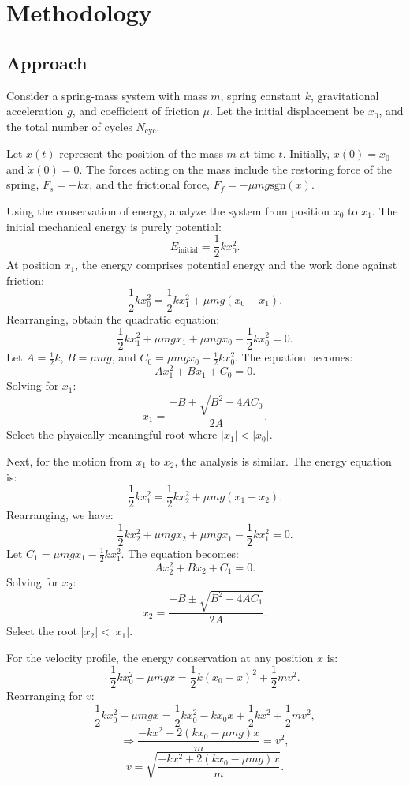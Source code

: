 \documentclass[12pt, a4paper, oneside]{report}
\begin{document}
\chapter{Methodology}
\section{Approach}
Consider a spring-mass system with mass \( m \), spring constant \( k \), gravitational acceleration \( g \), and coefficient of friction \( \mu \). Let the initial displacement be \( x_0 \), and the total number of cycles \( N_{\text{cyc}} \).

Let \( x(t) \) represent the position of the mass \( m \) at time \( t \). Initially, \( x(0) = x_0 \) and \( \dot{x}(0) = 0 \). The forces acting on the mass include the restoring force of the spring, \( F_s = -kx \), and the frictional force, \( F_f = -\mu mg \text{sgn}(\dot{x}) \).

Using the conservation of energy, analyze the system from position \( x_0 \) to \( x_1 \). The initial mechanical energy is purely potential:
\[
	E_{\text{initial}} = \frac{1}{2} k x_0^2.
\]
At position \( x_1 \), the energy comprises potential energy and the work done against friction:
\[
	\frac{1}{2} k x_0^2 = \frac{1}{2} k x_1^2 + \mu mg (x_0 + x_1).
\]
Rearranging, obtain the quadratic equation:
\[
	\frac{1}{2} k x_1^2 + \mu mg x_1 + \mu mg x_0 - \frac{1}{2} k x_0^2 = 0.
\]
Let \( A = \frac{1}{2} k \), \( B = \mu mg \), and \( C_0 = \mu mg x_0 - \frac{1}{2} k x_0^2 \). The equation becomes:
\[
	A x_1^2 + B x_1 + C_0 = 0.
\]
Solving for \( x_1 \):
\[
	x_1 = \frac{-B \pm \sqrt{B^2 - 4AC_0}}{2A}.
\]
Select the physically meaningful root where \( |x_1| < |x_0| \).

Next, for the motion from \( x_1 \) to \( x_2 \), the analysis is similar. The energy equation is:
\[
	\frac{1}{2} k x_1^2 = \frac{1}{2} k x_2^2 + \mu mg (x_1 + x_2).
\]
Rearranging, we have:
\[
	\frac{1}{2} k x_2^2 + \mu mg x_2 + \mu mg x_1 - \frac{1}{2} k x_1^2 = 0.
\]
Let \( C_1 = \mu mg x_1 - \frac{1}{2} k x_1^2 \). The equation becomes:
\[
	A x_2^2 + B x_2 + C_1 = 0.
\]
Solving for \( x_2 \):
\[
	x_2 = \frac{-B \pm \sqrt{B^2 - 4AC_1}}{2A}.
\]
Select the root \( |x_2| < |x_1| \).

For the velocity profile, the energy conservation at any position \( x \) is:
\[
	\frac{1}{2} k x_0^2 - \mu mg x = \frac{1}{2} k (x_0 - x)^2 + \frac{1}{2} m v^2.
\]
Rearranging for \( v \):
\[
	\frac{1}{2} k x_0^2 - \mu mg x = \frac{1}{2} k x_0^2 - k x_0 x + \frac{1}{2} k x^2 + \frac{1}{2} m v^2,
\]
\[
	\Rightarrow \frac{-k x^2 + 2 (k x_0 - \mu mg) x}{m} = v^2,
\]
\[
	v = \sqrt{\frac{-k x^2 + 2 (k x_0 - \mu mg) x}{m}}.
\]
\end{document}

